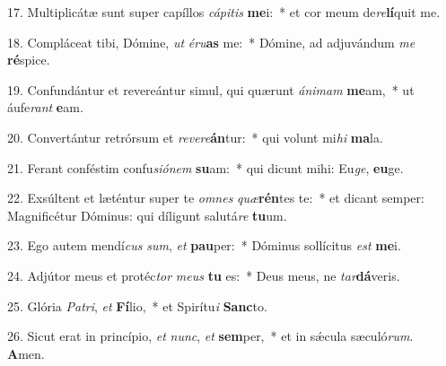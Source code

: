 17. Multiplicátæ sunt super capíllos \textit{cá}\textit{pi}\textit{tis} \textbf{me}i:~*  et cor meum de\textit{re}\textbf{lí}quit me.\

18. Compláceat tibi, Dómine, \textit{ut} \textit{é}\textit{ru}\textbf{as} me:~*  Dómine, ad adjuvándum \textit{me} \textbf{ré}spice.\

19. Confundántur et revereántur simul, qui quærunt \textit{á}\textit{ni}\textit{mam} \textbf{me}am,~*  ut áufe\textit{rant} \textbf{e}am.\

20. Convertántur retrórsum et \textit{re}\textit{ve}\textit{re}\textbf{án}tur:~*  qui volunt mi\textit{hi} \textbf{ma}la.\

21. Ferant conféstim confu\textit{si}\textit{ó}\textit{nem} \textbf{su}am:~*  qui dicunt mihi: Eu\textit{ge}, \textbf{eu}ge.\

22. Exsúltent et læténtur super te \textit{om}\textit{nes} \textit{quæ}\textbf{rén}tes te:~*  et dicant semper: Magnificétur Dóminus: qui díligunt salutá\textit{re} \textbf{tu}um.\

23. Ego autem mendí\textit{cus} \textit{sum}, \textit{et} \textbf{pau}per:~*  Dóminus sollícitus \textit{est} \textbf{me}i.\

24. Adjútor meus et protéc\textit{tor} \textit{me}\textit{us} \textbf{tu} es:~*  Deus meus, ne \textit{tar}\textbf{dá}veris.\

25. Glória \textit{Pa}\textit{tri}, \textit{et} \textbf{Fí}lio,~*  et Spirítu\textit{i} \textbf{Sanc}to.\

26. Sicut erat in princípio, \textit{et} \textit{nunc}, \textit{et} \textbf{sem}per,~*  et in sǽcula sæculó\textit{rum}. \textbf{A}men.\

